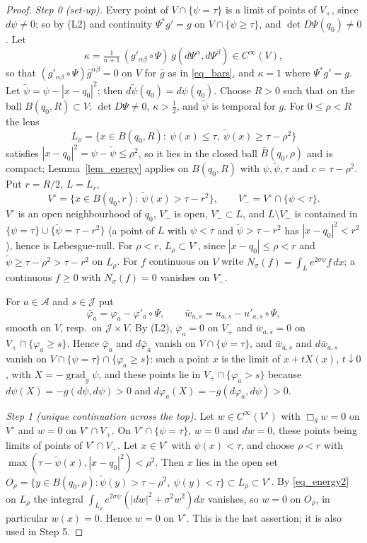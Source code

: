 \documentclass[11pt,a4paper,reqno]{amsart}
\theoremstyle{definition}
\numberwithin{equation}{section}
\newcommand{\cA}{\mathcal{A}}
\newcommand{\cJ}{\mathcal{J}}
\newcommand{\bg}{\bar g}
\newcommand{\bphi}{\bar\varphi}
\newcommand{\bw}{\bar w}
\newcommand{\grad}{\operatorname{grad}}
\begin{document}
\begin{proof}
\emph{Step 0 (set-up).} Every point of $V\cap\{\psi=\tau\}$ is a limit of points of $V_+$, since $d\psi\ne0$; so by
\textup{(L2)} and continuity $\Psi^*g'=g$ on $V\cap\{\psi\ge\tau\}$, and $\det D\Psi(q_0)\ne0$. Let
\[
\kappa=\tfrac1{n+1}\,(g'_{\alpha\beta}\circ\Psi)\,g(d\Psi^\alpha,d\Psi^\beta)\in C^\infty(V),
\]
so that $(g'_{\alpha\beta}\circ\Psi)\bg^{\alpha\beta}=0$ on $V$ for $\bg$ as in \eqref{eq_bars}, and $\kappa=1$ where
$\Psi^*g'=g$. Let $\tilde\psi=\psi-|x-q_0|^2$; then $d\tilde\psi(q_0)=d\psi(q_0)$. Choose $R>0$ such that on the ball
$B(q_0,R)\subset V$: $\det D\Psi\ne0$, $\kappa>\frac12$, and $\tilde\psi$ is temporal for $g$. For $0\le\rho<R$ the lens
\[
L_\rho=\{x\in B(q_0,R):\ \psi(x)\le\tau,\ \tilde\psi(x)\ge\tau-\rho^2\}
\]
satisfies $|x-q_0|^2=\psi-\tilde\psi\le\rho^2$, so it lies in the closed ball $\bar B(q_0,\rho)$ and is compact; Lemma~\ref{lem_energy}
applies on $B(q_0,R)$ with $\psi,\tilde\psi,\tau$ and $c=\tau-\rho^2$. Put $r=R/2$, $L=L_r$,
\[
V^\circ=\{x\in B(q_0,r):\ \tilde\psi(x)>\tau-r^2\},\qquad V^\circ_-=V^\circ\cap\{\psi<\tau\}.
\]
$V^\circ$ is an open neighbourhood of $q_0$, $V^\circ_-$ is open, $V^\circ_-\subset L$, and $L\setminus V^\circ_-$ is
contained in $\{\psi=\tau\}\cup\{\tilde\psi=\tau-r^2\}$ (a point of $L$ with $\psi<\tau$ and $\tilde\psi>\tau-r^2$ has
$|x-q_0|^2<r^2$), hence is Lebesgue-null. For $\rho<r$, $L_\rho\subset V^\circ$, since $|x-q_0|\le\rho<r$ and
$\tilde\psi\ge\tau-\rho^2>\tau-r^2$ on $L_\rho$. For $f$ continuous on $V$ write $N_\sigma(f)=\int_Le^{2\sigma\psi}f\,dx$; a
continuous $f\ge0$ with $N_\sigma(f)=0$ vanishes on $V^\circ_-$.

For $a\in\cA$ and $s\in\cJ$ put
\[
\bphi_a=\varphi_a-\varphi'_a\circ\Psi,\qquad \bw_{a,s}=u_{a,s}-u'_{a,s}\circ\Psi,
\]
smooth on $V$, resp.\ on $\cJ\times V$. By \textup{(L2)}, $\bphi_a=0$ on $V_+$ and $\bw_{a,s}=0$ on $V_+\cap\{\varphi_a\ge s\}$.
Hence $\bphi_a$ and $d\bphi_a$ vanish on $V\cap\{\psi=\tau\}$, and $\bw_{a,s}$ and $d\bw_{a,s}$ vanish on
$V\cap\{\psi=\tau\}\cap\{\varphi_a\ge s\}$: such a point $x$ is the limit of $x+tX(x)$, $t\downarrow0$, with $X=-\grad_g\psi$,
and these points lie in $V_+\cap\{\varphi_a>s\}$ because $d\psi(X)=-g(d\psi,d\psi)>0$ and $d\varphi_a(X)=-g(d\varphi_a,d\psi)>0$.

\emph{Step 1 (unique continuation across the top).} Let $w\in C^\infty(V^\circ)$ with $\Box_gw=0$ on $V^\circ$ and $w=0$ on
$V^\circ\cap V_+$. On $V^\circ\cap\{\psi=\tau\}$, $w=0$ and $dw=0$, these points being limits of points of $V^\circ\cap V_+$.
Let $x\in V^\circ$ with $\psi(x)<\tau$, and choose $\rho<r$ with $\max(\tau-\tilde\psi(x),|x-q_0|^2)<\rho^2$. Then $x$ lies in the
open set $O_\rho=\{y\in B(q_0,\rho):\tilde\psi(y)>\tau-\rho^2,\ \psi(y)<\tau\}\subset L_\rho\subset V^\circ$. By
\eqref{eq_energy2} on $L_\rho$ the integral $\int_{L_\rho}e^{2\sigma\psi}(|dw|^2+\sigma^2w^2)dx$ vanishes, so $w=0$ on $O_\rho$, in
particular $w(x)=0$. Hence $w=0$ on $V^\circ$. This is the last assertion; it is also used in Step 5.


\end{proof}
\end{document}
